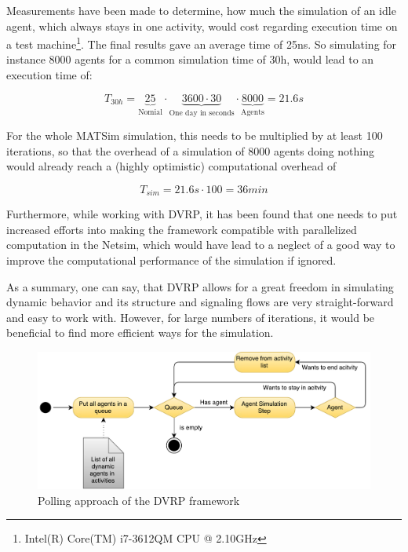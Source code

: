 Measurements have been made to determine, how much the simulation of an idle agent,
which always stays in one activity, would cost regarding execution time
on a test machine\footnote{Intel(R) Core(TM) i7-3612QM CPU @ 2.10GHz}. The final results
gave an average time of 25ns. So simulating for instance 8000 agents for a common
simulation time of 30h, would lead to an execution time of:

\begin{equation}
T_{30h} = \underbrace{25}_{\text{Nomial}} \cdot \underbrace{3600 \cdot 30}_{\text{One day in seconds}} \cdot \underbrace{8000}_{\text{Agents}} = 21.6s
\end{equation}

For the whole MATSim simulation, this needs to be multiplied by at least 100 iterations,
so that the overhead of a simulation of 8000 agents doing nothing would already
reach a (highly optimistic) computational overhead of

\begin{equation}
T_{sim} = 21.6s \cdot 100 = 36min
\end{equation}

Furthermore, while working with DVRP, it has been found that one needs to put
increased efforts into making the framework compatible with parallelized computation
in the Netsim, which would have lead to a neglect of a good way to improve the computational
performance of the simulation if ignored.

As a summary, one can say, that DVRP allows for a great freedom in simulating
dynamic behavior and its structure and signaling flows are very straight-forward
and easy to work with. However, for large numbers of iterations, it would
be beneficial to find more efficient ways for the simulation.

\begin{figure}
    \centering
    \includegraphics[width=1.0\textwidth]{figures/polling.pdf}
    \caption{Polling approach of the DVRP framework}
    \label{fig:polling}
\end{figure}

